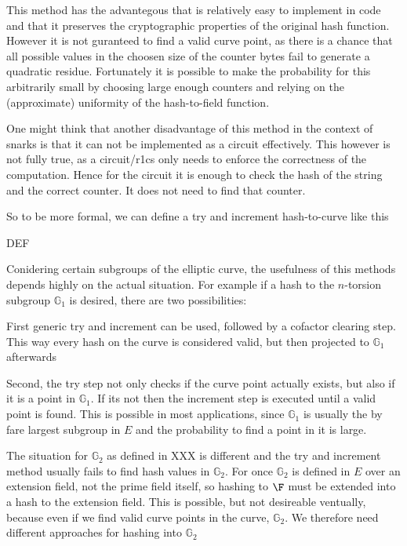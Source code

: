 This method has the advantegous that is relatively easy to implement in code and that it preserves the cryptographic properties of the original hash function. However it is not guranteed to find a valid curve point, as there is a chance that all possible values in the choosen size of the counter bytes fail to generate a quadratic residue. Fortunately it is possible to make the probability for this arbitrarily small by choosing large enough counters and relying on the (approximate) uniformity of the hash-to-field function. 

One might think that another disadvantage of this method in the context of snarks is that it can not be implemented as a circuit effectively. This however is not fully true, as a circuit/r1cs only needs to enforce the correctness of the computation. Hence for the circuit it is enough to check the hash of the string and the correct counter. It does not need to find that counter.

So to be more formal, we can define a try and increment hash-to-curve like this

DEF


Conidering certain subgroups of the elliptic curve, the usefulness of this methods depends highly on the actual situation. For example if a hash to the $n$-torsion subgroup $\mathbb{G}_1$ is desired, there are two possibilities: 

First generic try and increment can be used, followed by a cofactor clearing step. This way every hash on the curve is considered valid, but then projected to $\mathbb{G}_1$ afterwards 

Second, the try step not only checks if the curve point actually exists, but also if it is a point in $\mathbb{G}_1$. If its not then the increment step is executed until a valid point is found. This is possible in most applications, since $\mathbb{G}_1$ is usually the by fare largest subgroup in $E$ and the probability to find a point in it is large.

The situation for $\mathbb{G}_2$ as defined in XXX is different and the try and increment method usually fails to find hash values in $\mathbb{G}_2$. For once $\mathbb{G}_2$ is defined in $E$ over an extension field, not the prime field itself, so hashing to $\F$ must be extended into a hash to the extension field. This is possible, but not desireable ventually, because even if we find valid curve points in the curve, $\mathbb{G}_2$. We therefore need different approaches for hashing into $\mathbb{G}_2$

